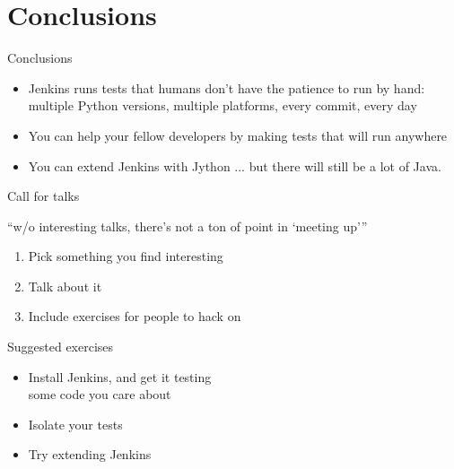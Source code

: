 \documentclass[xcolor=svgnames,17pt]{beamer}
\begin{document}
\section{Conclusions}

\begin{frame}{}
\tableofcontents[currentsection]
\end{frame}

\begin{frame}{Conclusions}
\begin{itemize}
\item Jenkins runs tests that humans don’t have the patience to run by
hand: multiple Python versions, multiple platforms, every commit, every day
\pause
\item You can help your fellow developers by making tests that will run
anywhere
\pause
\item You can extend Jenkins with Jython ...
\pause but there will still be a lot of Java.
\end{itemize}
\end{frame}

\appendix

\begin{frame}
\end{frame}

\begin{frame}{Call for talks}

“w/o interesting talks, there's not a ton of point in ‘meeting up’”

\pause

\begin{enumerate}
\item Pick something you find interesting
\item Talk about it
\item Include exercises for people to hack on
\end{enumerate}

\end{frame}

\begin{frame}{Suggested exercises}
\begin{itemize}
\item Install Jenkins, and get it testing \\ some code you care about
\item Isolate your tests
\item Try extending Jenkins
\end{itemize}
\end{frame}
\end{document}
